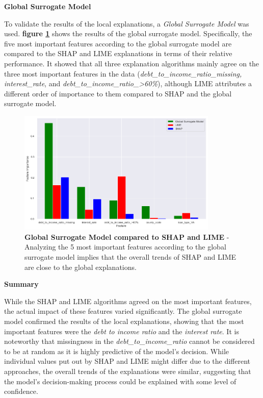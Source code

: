 \textbf{Global Surrogate Model}

To validate the results of the local explanations, a \textit{Global Surrogate Model} was used. \textbf{figure \ref{fig:Global_Surrogate}} shows the results of the global surrogate model. Specifically, the five most important features according to the global surrogate model are compared to the SHAP and LIME explanations in terms of their relative performance.
It showed that all three explanation algorithms mainly agree on the three most important features in the data (\textit{debt\_to\_income\_ratio\_missing, interest\_rate}, and \textit{debt\_to\_income\_ratio\_>60\%}), although LIME attributes a different order of importance to them compared to SHAP and the global surrogate model.

\begin{figure}[!htbp]
    \centering
    \includegraphics[width=0.85\textwidth]{images/CHXX_UPDATE_Surrogate_SHAP_LIME_combined.png}
    \caption[Global Surrogate Model compared to SHAP and LIME]{\textbf{Global Surrogate Model compared to SHAP and LIME} - Analyzing the 5 most important features according to the global surrogate model implies that the overall trends of SHAP and LIME are close to the global explanations.}
    \label{fig:Global_Surrogate}
\end{figure}

\textbf{Summary}

While the SHAP and LIME algorithms agreed on the most important features, the actual impact of these features varied significantly. The global surrogate model confirmed the results of the local explanations, showing that the most important features were the \textit{debt to income ratio} and the \textit{interest rate}. 
It is noteworthy that missingness in the \textit{debt\_to\_income\_ratio} cannot be considered to be at random as it is highly predictive of the model's decision. 
While individual values put out by SHAP and LIME might differ due to the different approaches, the overall trends of the explanations were similar, suggesting that the model's decision-making process could be explained with some level of confidence.

